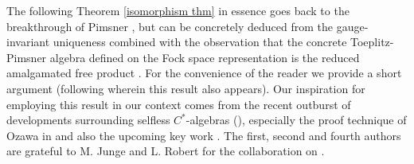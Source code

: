 \documentclass[10pt]{amsart}
\theoremstyle{definition}
\begin{document}
The following Theorem \ref{isomorphism thm} in essence goes back to the breakthrough of Pimsner \cite{pimsner1997class}, but can be concretely deduced from the gauge-invariant uniqueness \cite{FowlerMuhlyRaeburn2003} combined with the observation that the concrete Toeplitz-Pimsner algebra defined on the Fock space representation  is the reduced amalgamated free product \cite{shlyakhtenko1999valued}. For the convenience of the reader we provide a short argument (following \cite{brown2008textrm} wherein this result also appears). Our inspiration for employing this result in our context comes from the recent outburst of developments surrounding selfless $C^*$-algebras (\cite{robertselfless, amrutam2025strictcomparisonreducedgroup, raum2025strictcomparisontwistedgroup, HKER, ozawa2025proximalityselflessnessgroupcalgebras, hayes2025selfless, relativeselfless, elayavalli2025negativeresolutioncalgebraictarski, vigdorovich2025structural, vigdorovich2026selflessreducedcalgebraslinear, flores2026purenessstablerankreduced, avni2025mixedidentitieslineargroups, BradfordSisto2026,  yang2025extreme,  fmmm2025selflessfreeprod, selflessAFPs}), especially the proof technique of Ozawa in \cite{ozawa2025proximalityselflessnessgroupcalgebras} and also the upcoming key work \cite{relativeselfless}. The first, second and fourth authors are grateful to M. Junge and L. Robert for the collaboration on \cite{relativeselfless}.

\end{document}
